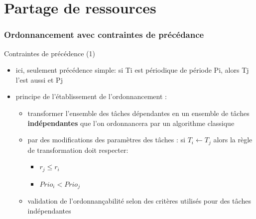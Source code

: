 %                                                                                                               
%
%

\part{Partage de ressources}

\section{Ordonnancement avec contraintes de précédance}

\begin{frame}{Contraintes de précédence (1)} 
  \begin{itemize}
  \item ici, seulement précédence simple: si Ti est périodique de période Pi, alors Tj l'est aussi et Pj 
  \item principe de l'établissement de l'ordonnancement :
    \begin{itemize} 
    \item transformer l'ensemble des tâches dépendantes en un ensemble de tâches \textbf{indépendantes} que l'on ordonnancera par un algorithme classique
    \item par des modifications des paramètres des tâches : si $T_i \leftarrow T_j$ alors la règle de transformation doit respecter:
      \begin{itemize} 
      \item $r_j \le r_i$
      \item $Prio_i < Prio_j$
      \end{itemize} 
    \item validation de l'ordonnançabilité selon des critères utilisés pour des tâches indépendantes
    \end{itemize}
  \end{itemize}
\end{frame}

